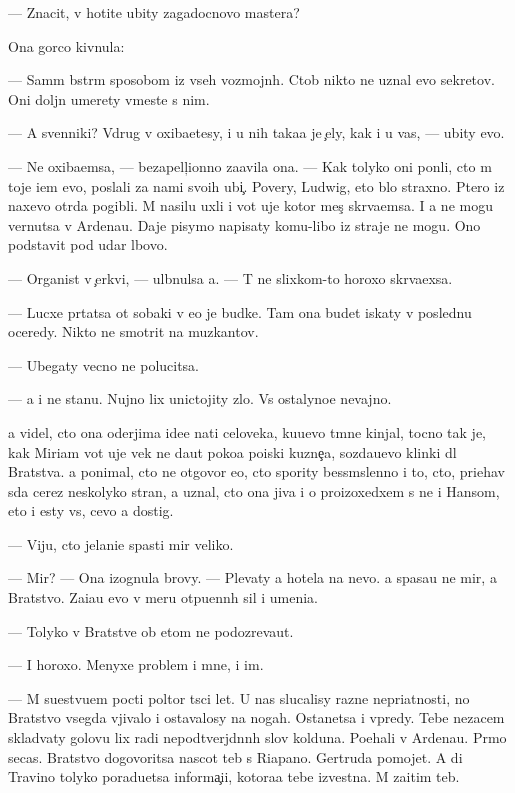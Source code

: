 \documentclass[10pt]{book}
\begin{document}
— Znacit, v{\yi} hotite ubity zagadocnovo mastera?

Ona gor{\ia}co kivnula:

— Sam{\yi}m b{\yi}str{\yi}m sposobom iz vseh vozmojn{\yi}h. Ctob{\yi} nikto ne uznal {\y}evo sekretov. Oni doljn{\yi} umerety vmeste s nim.

— A sv{\ia}{\x}enniki? Vdrug v{\yi} oxiba{\y}etesy, i u nih taka{\y}a je {\c}ely, kak i u vas, — ubity {\y}evo.

— Ne oxiba{\y}emsa, — bezapell{\ia}{\c}ionno za{\y}avila ona. — Kak tolyko oni pon{\ia}li, cto m{\yi} toje i{\x}em {\y}evo, poslali za nami svo{\y}ih ubi{\y}{\c}. Povery, Ludwig, eto b{\yi}lo straxno. P{\ia}tero iz naxevo otr{\ia}da pogibli. M{\yi} nasilu uxli i vot uje kotor{\yi}{\y} mes{\ia}{\c} skr{\yi}va{\y}emsa. I {\y}a ne mogu vernutsa v Ardenau. Daje pisymo napisaty komu-libo iz straje{\y} ne mogu. Ono podstavit pod udar l{\iu}bovo.

— Organist v {\c}erkvi, — ul{\yi}bnulsa {\y}a. — T{\yi} ne slixkom-to horoxo skr{\yi}va{\y}exsa.

— Lucxe pr{\ia}tatsa ot sobaki v {\y}e{\y}o je budke. Tam ona budet iskaty v posledn{\iu}{\y}u oceredy. Nikto ne smotrit na muz{\yi}kantov.

— Ubegaty vecno ne polucitsa.

— {\Y}a i ne stanu. Nujno lix unictojity zlo. Vs{\e} ostalyno{\y}e nevajno.

{\Y}a videl, cto ona oderjima ide{\y}e{\y} na{\y}ti celoveka, ku{\y}u{\x}evo t{\e}mn{\yi}{\y}e kinjal{\yi}, tocno tak je, kak Miriam vot uje vek ne da{\y}ut poko{\y}a poiski kuzne{\c}a, sozda{\y}u{\x}evo klinki dl{\ia} Bratstva. {\Y}a ponimal, cto ne otgovor{\iu} {\y}e{\y}o, cto spority bessm{\yi}slenno i to, cto, pri{\y}ehav s{\iu}da cerez neskolyko stran, {\y}a uznal, cto ona jiva i o proizoxedxem s ne{\y} i Hansom, eto i {\y}esty vs{\e}, cevo {\y}a dostig.

— Viju, cto jelani{\y}e spasti mir veliko.

— Mir? — Ona izognula brovy. — Plevaty {\y}a hotela na nevo. {\Y}a spasa{\y}u ne mir, a Bratstvo. Za{\x}i{\x}a{\y}u {\y}evo v meru otpu{\x}enn{\yi}h sil i umeni{\y}a.

— Tolyko v Bratstve ob etom ne podozreva{\y}ut.

— I horoxo. Menyxe problem i mne, i im.

— M{\yi} su{\x}estvu{\y}em pocti poltor{\yi} t{\yi}s{\ia}ci let. U nas slucalisy razn{\yi}{\y}e nepri{\y}atnosti, no Bratstvo vsegda v{\yi}jivalo i ostavalosy na nogah. Ostanetsa i vpredy. Tebe nezacem sklad{\yi}vaty golovu lix radi nepodtverjd{\e}nn{\yi}h slov kolduna. Po{\y}ehali v Ardenau. Pr{\ia}mo se{\y}cas. Bratstvo dogovoritsa nascot teb{\ia} s Riapano. Gertruda pomojet. A di Travino tolyko poradu{\y}etsa informa{\c}i{\y}i, kotora{\y}a tebe izvestna. M{\yi} za{\x}itim teb{\ia}.
\end{document}
